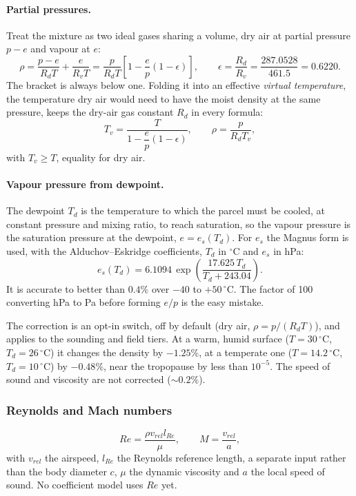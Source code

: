 \paragraph{Partial pressures.} Treat the mixture as two ideal gases sharing a volume, dry air at
partial pressure $p-e$ and vapour at $e$:
\begin{equation}
    \rho = \frac{p-e}{R_dT} + \frac{e}{R_vT}
         = \frac{p}{R_dT}\left[1 - \frac{e}{p}\left(1 - \epsilon\right)\right], \qquad
    \epsilon = \frac{R_d}{R_v} = \frac{287.0528}{461.5} = 0.6220.
\end{equation}
The bracket is always below one. Folding it into an effective \emph{virtual temperature}, the
temperature dry air would need to have the moist density at the same pressure, keeps the
dry-air gas constant $R_d$ in every formula:
\begin{equation} \label{eq:virtual_temperature}
    T_v = \frac{T}{1 - \dfrac{e}{p}\left(1-\epsilon\right)}, \qquad
    \rho = \frac{p}{R_dT_v},
\end{equation}
with $T_v \geq T$, equality for dry air.

\paragraph{Vapour pressure from dewpoint.} The dewpoint $T_d$ is the temperature to which the
parcel must be cooled, at constant pressure and mixing ratio, to reach saturation, so the vapour
pressure is the saturation pressure at the dewpoint, $e=e_s(T_d)$. For $e_s$ the Magnus form is
used, with the Alduchov--Eskridge coefficients, $T_d$ in $^\circ\mathrm{C}$ and $e_s$ in hPa:
\begin{equation} \label{eq:magnus}
    e_s(T_d) = 6.1094\,\exp\!\left(\frac{17.625\,T_d}{T_d + 243.04}\right).
\end{equation}
It is accurate to better than $0.4\%$ over $-40$ to $+50\,^\circ\mathrm{C}$. The factor of 100
converting hPa to Pa before forming $e/p$ is the easy mistake.

The correction is an opt-in switch, off by default (dry air, $\rho=p/(R_dT)$), and applies to the
sounding and field tiers. At a warm, humid surface ($T=30\,^\circ\mathrm{C}$,
$T_d=26\,^\circ\mathrm{C}$) it changes the density by $-1.25\%$, at a temperate one
($T=14.2\,^\circ\mathrm{C}$, $T_d=10\,^\circ\mathrm{C}$) by $-0.48\%$, near the tropopause by less
than $10^{-5}$. The speed of sound and viscosity are not corrected ($\sim0.2\%$).

\subsubsection{Reynolds and Mach numbers}\label{sec:reynolds_mach}
\begin{equation}
    Re = \frac{\rho v_{rel} l_{Re}}{\mu}, \qquad M = \frac{v_{rel}}{a},
\end{equation}
with $v_{rel}$ the airspeed, $l_{Re}$ the Reynolds reference length, a separate input
rather than the body diameter $c$, $\mu$ the dynamic viscosity and $a$ the
local speed of sound. No coefficient model uses $Re$ yet.


